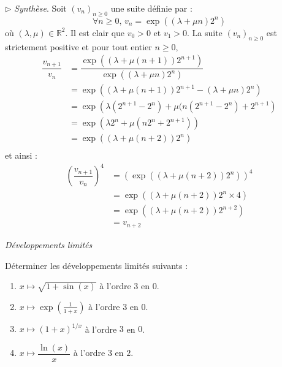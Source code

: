 \documentclass[a4paper,10pt]{report}
\begin{document}
\medskip

\noindent $\rhd$ \textit{Synthèse}. Soit $(v_n)_{n \geq 0}$ une suite définie par :
$$ \forall n \geq 0, \, v_n = \exp((\lambda+ \mu n)2^n)$$
où $(\lambda, \mu) \in \mathbb{R}^2$. Il est clair que $v_0>0$ et $v_1>0$. La suite $(v_n)_{n \geq 0}$ est strictement positive et pour tout entier $n \geq 0$,
\begin{align*}
\dfrac{v_{n+1}}{v_n} & = \dfrac{\exp((\lambda+ \mu (n+1))2^{n+1})}{\exp((\lambda+ \mu n)2^n)} \\
& = \exp \left( (\lambda+ \mu (n+1))2^{n+1} - (\lambda+ \mu n)2^n \right) \\
& = \exp \left( \lambda (2^{n+1}-2^n) + \mu (n(2^{n+1}-2^n) + 2^{n+1} \right) \\
& = \exp  \left( \lambda 2^n + \mu (n2^n+2^{n+1}) \right) \\
& = \exp  \left( (\lambda + \mu (n+2))2^n \right) \\
\end{align*}
et ainsi :
\begin{align*}
\left( \dfrac{v_{n+1}}{v_n}  \right)^4 & = \left(\exp  \left( (\lambda + \mu (n+2))2^n \right)\right)^4 \\
& = \exp  \left( (\lambda + \mu (n+2))2^n \times 4 \right)\\
& = \exp  \left( (\lambda + \mu (n+2))2^{n+2} \right) \\
& = v_{n+2}
\end{align*}

\medskip


\begin{center}
\textit{{ {\large Développements limités}}}
\end{center}

\medskip



\begin{Exa}
Déterminer les développements limités suivants :

\begin{multicols}{2}
\begin{enumerate}
\item $x \mapsto \sqrt{1+\sin(x)}$ à l'ordre $3$ en $0$.
\item $x \mapsto \exp \left( \frac{1}{1+x}\right)$ à l'ordre $3$ en $0$.
\item $x \mapsto (1+x)^{1/x}$ à l'ordre $3$ en $0$.
\item $x \mapsto \dfrac{\ln(x)}{x}$ à l'ordre $3$ en $2$.
\end{enumerate}
\end{multicols}

\vspace{0.1cm}
\end{Exa} 
 
\end{document}
